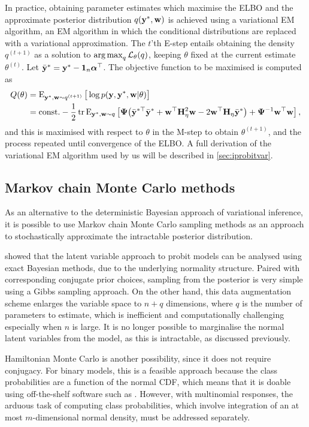 In practice, obtaining parameter estimates which maximise the ELBO and the approximate posterior distribution $q({\mathbf y}^*,{\mathbf w}) $ is achieved using a variational EM algorithm, an EM algorithm in which the conditional distributions are replaced with a variational approximation.
The $t$'th E-step entails obtaining the density $q^{(t+1)}$ as a solution to $\operatorname*{arg\,max}_q {\mathcal L}_\theta(q)$, keeping $\theta$ fixed at the current estimate $\theta^{(t)}$.
Let $\bar{{\mathbf y}}^* = {\mathbf y}^* - {\mathbf 1}_n{\bm\alpha}^\top$.
The objective function to be maximised is computed as
\begin{align*}
  Q(\theta) 
  &= \operatorname{E}_{{\mathbf y}^*,{\mathbf w}\sim q^{(t+1)}}  \big[ \log p({\mathbf y},{\mathbf y}^*,{\mathbf w}|\theta) \big] \\
  &= \text{const.}\hspace{0.01em} -\frac{1}{2} \operatorname{tr}\operatorname{E}_{{\mathbf y}^*,{\mathbf w}\sim q} \left[ 
  {\bm\Psi}\big( \bar{{\mathbf y}}^{*\top}\bar{{\mathbf y}}^* + {\mathbf w}^\top{\mathbf H}_\eta^2{\mathbf w} - 2{\mathbf w}^\top{\mathbf H}_\eta\bar{{\mathbf y}}^* \big)
  + {\bm\Psi}^{-1} {\mathbf w}^\top{\mathbf w} 
  \right],
\end{align*}
and this is maximised with respect to $\theta$ in the M-step to obtain $\theta^{(t+1)}$, and the process repeated until convergence of the ELBO.
A full derivation of the variational EM algorithm used by us will be described in \cref{sec:iprobitvar}.

\subsection{Markov chain Monte Carlo methods}

As an alternative to the deterministic Bayesian approach of variational inference, it is possible to use Markov chain Monte Carlo sampling methods as an approach to stochastically approximate the intractable posterior distribution.

\citet{albert1993bayesian} showed that the latent variable approach to probit models can be analysed using exact Bayesian methods, due to the underlying normality structure.
Paired with corresponding conjugate prior choices, sampling from the posterior is very simple using a Gibbs sampling approach.
On the other hand, this data augmentation scheme enlarges the variable space to $n+q$ dimensions, where $q$ is the number of parameters to estimate, which is inefficient and computationally challenging especially when $n$ is large.
It is no longer possible to marginalise the normal latent variables from the model, as this is intractable, as discussed previously.

Hamiltonian Monte Carlo is another possibility, since it does not require conjugacy.
For binary models, this is a feasible approach because the class probabilities are a function of the normal CDF, which means that it is doable using off-the-shelf software such as .
However, with multinomial responses, the arduous task of computing class probabilities, which involve integration of an at most $m$-dimensional normal density, must be addressed separately.


